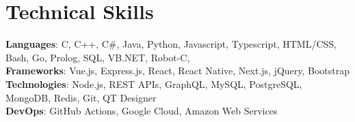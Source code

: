 \section{Technical Skills}
    \begin{itemize}[leftmargin=0.15in, label={}]
	\small{\item{
		\textbf{Languages}{: C, C++, C\#, Java, Python, Javascript, Typescript, HTML/CSS, Bash, Go, Prolog, SQL, VB.NET, Robot-C,} \\
		\textbf{Frameworks}{: Vue.js, Express.js, React, React Native, Next.js, jQuery, Bootstrap} \\
		\textbf{Technologies}{: Node.js, REST APIs, GraphQL, MySQL, PostgreSQL, MongoDB, Redis, Git, QT Designer} \\
		\textbf{DevOps}{: GitHub Actions, Google Cloud, Amazon Web Services}
	}}
    \end{itemize}
